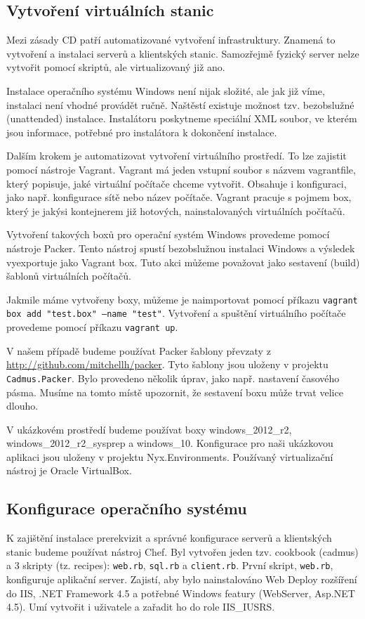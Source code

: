 \subsection{Vytvoření virtuálních stanic}
Mezi zásady CD patří automatizované vytvoření infrastruktury. Znamená to vytvoření a instalaci serverů a klientských stanic. Samozřejmě fyzický server nelze vytvořit pomocí skriptů, ale virtualizovaný již ano. 

Instalace operačního systému Windows není nijak složité, ale jak již víme, instalaci není vhodné provádět ručně. Naštěstí existuje možnost tzv. bezobslužné (unattended) instalace. Instalátoru poskytneme speciální XML soubor, ve kterém jsou informace, potřebné pro instalátora k dokončení instalace.

Dalším krokem je automatizovat vytvoření virtuálního prostředí. To lze zajistit pomocí nástroje Vagrant. Vagrant má jeden vstupní soubor s názvem vagrantfile, který popisuje, jaké virtuální počítače chceme vytvořit. Obsahuje i konfiguraci, jako např. konfigurace sítě nebo název počítače. Vagrant pracuje s pojmem box, který je jakýsi kontejnerem již hotových, nainstalovaných virtuálních počítačů. 

Vytvoření takových boxů pro operační systém Windows provedeme pomocí nástroje Packer. Tento nástroj spustí bezobslužnou instalaci Windows a výsledek vyexportuje jako Vagrant box. Tuto akci můžeme považovat jako sestavení (build) šablonů virtuálních počítačů.

Jakmile máme vytvořeny boxy, můžeme je naimportovat pomocí příkazu \texttt{vagrant box add "test.box" --name "test"}. Vytvoření a spuštění virtuálního počítače provedeme pomocí příkazu \texttt{vagrant up}. 

V našem případě budeme používat Packer šablony převzaty z \url{http://github.com/mitchellh/packer}. Tyto šablony jsou uloženy v projektu \texttt{Cadmus.Packer}. Bylo provedeno několik úprav, jako např. nastavení časového pásma. Musíme na tomto místě upozornit, že sestavení boxu může trvat velice dlouho. 

V ukázkovém prostředí budeme používat boxy windows\_2012\_r2, windows\_2012\_r2\_sysprep a windows\_10. Konfigurace pro naši ukázkovou aplikaci jsou uloženy v projektu Nyx.Environments. Používaný virtualizační nástroj je Oracle VirtualBox.

\subsection{Konfigurace operačního systému}
\label{ch:serverconfig}
K zajištění instalace prerekvizit a správné konfigurace serverů a klientských stanic budeme používat nástroj Chef. Byl vytvořen jeden tzv. cookbook (cadmus) a 3 skripty (tz. recipes): \texttt{web.rb}, \texttt{sql.rb} a \texttt{client.rb}. První skript, \texttt{web.rb}, konfiguruje aplikační server. Zajistí, aby bylo nainstalováno Web Deploy rozšíření do IIS, .NET Framework 4.5 a potřebné Windows featury (WebServer, Asp.NET 4.5). Umí vytvořit i uživatele a zařadit ho do role IIS\_IUSRS.

